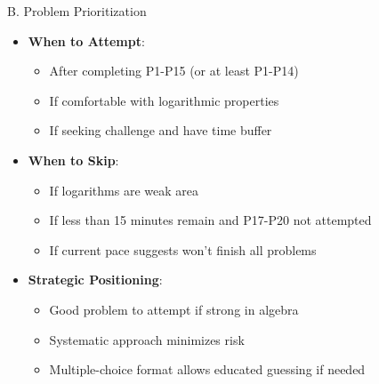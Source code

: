 \documentclass[12pt]{article}
\begin{document}
\begin{competitionbox}{B. Problem Prioritization}
\begin{itemize}[leftmargin=*]
    \item \textbf{When to Attempt}:
    \begin{itemize}
        \item After completing P1-P15 (or at least P1-P14)
        \item If comfortable with logarithmic properties
        \item If seeking challenge and have time buffer
    \end{itemize}
    
    \item \textbf{When to Skip}:
    \begin{itemize}
        \item If logarithms are weak area
        \item If less than 15 minutes remain and P17-P20 not attempted
        \item If current pace suggests won't finish all problems
    \end{itemize}
    
    \item \textbf{Strategic Positioning}:
    \begin{itemize}
        \item Good problem to attempt if strong in algebra
        \item Systematic approach minimizes risk
        \item Multiple-choice format allows educated guessing if needed
    \end{itemize}
\end{itemize}
\end{competitionbox}
\end{document}
